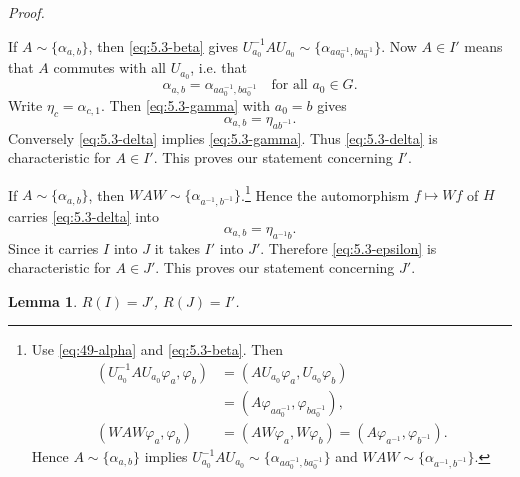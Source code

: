 \documentclass[b5paper,twoside]{article}
\theoremstyle{mvnplain}
\newtheorem{lemma}{Lemma}[section]
\renewenvironment{proof}[1][Proof]{%
  \par\addvspace{0.35\baselineskip}%
  \noindent\textit{#1.}\ \normalfont\ignorespaces
}{%
  \par\addvspace{0.35\baselineskip}%
}
\newcommand{\R}{\mathbf R}
\newcommand{\Hilbert}{\mathfrak H}
\def\R{R}%
\def\Hilbert{H}%
\def\mathfrak#1{#1}%
\begin{document}
\begin{proof}
If \(A\sim\{\alpha_{a,b}\}\), then \eqref{eq:5.3-beta} gives
\(U_{a_0}^{-1}AU_{a_0}\sim
\{\alpha_{aa_0^{-1},ba_0^{-1}}\}\). Now \(A\in I'\) means that \(A\)
commutes with all \(U_{a_0}\), i.e. that
\begin{equation}\tag{5.3.\(\gamma\)}\label{eq:5.3-gamma}
 \alpha_{a,b}=\alpha_{aa_0^{-1},ba_0^{-1}}
 \quad\text{for all }a_0\in\mathfrak G.
\end{equation}
Write \(\eta_c=\alpha_{c,1}\). Then \eqref{eq:5.3-gamma} with \(a_0=b\)
gives
\begin{equation}\tag{5.3.\(\delta\)}\label{eq:5.3-delta}
 \alpha_{a,b}=\eta_{ab^{-1}}.
\end{equation}
Conversely \eqref{eq:5.3-delta} implies \eqref{eq:5.3-gamma}. Thus
\eqref{eq:5.3-delta} is characteristic for \(A\in I'\). This proves our
statement concerning \(I'\).

If \(A\sim\{\alpha_{a,b}\}\), then
\(WAW\sim\{\alpha_{a^{-1},b^{-1}}\}\).\footnote{\label{fn:50}Use
\eqref{eq:49-alpha} and \eqref{eq:5.3-beta}. Then
\begin{align*}
 (U_{a_0}^{-1}AU_{a_0}\varphi_a,\varphi_b)
 &=(AU_{a_0}\varphi_a,U_{a_0}\varphi_b)\\
 &=(A\varphi_{aa_0^{-1}},\varphi_{ba_0^{-1}}),\\
 (WAW\varphi_a,\varphi_b)
 &=(AW\varphi_a,W\varphi_b)
  =(A\varphi_{a^{-1}},\varphi_{b^{-1}}).
\end{align*}
Hence \(A\sim\{\alpha_{a,b}\}\) implies
\(U_{a_0}^{-1}AU_{a_0}\sim
\{\alpha_{aa_0^{-1},ba_0^{-1}}\}\) and
\(WAW\sim\{\alpha_{a^{-1},b^{-1}}\}\).} Hence the automorphism
\(f\mapsto Wf\) of \(\Hilbert\) carries \eqref{eq:5.3-delta} into
\begin{equation}\tag{5.3.\(\epsilon\)}\label{eq:5.3-epsilon}
 \alpha_{a,b}=\eta_{a^{-1}b}.
\end{equation}
Since it carries \(I\) into \(J\) it takes \(I'\) into \(J'\). Therefore
\eqref{eq:5.3-epsilon} is characteristic for \(A\in J'\). This proves our
statement concerning \(J'\).
\end{proof}

\begin{lemma}\label{lem:5.3.3}
\(\R(I)=J'\), \(\R(J)=I'\).
\end{lemma}
\end{document}
